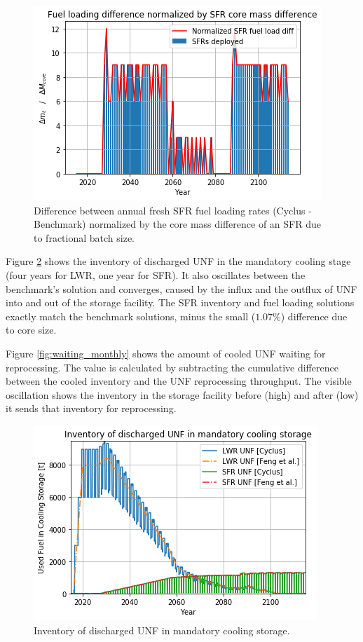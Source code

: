 \begin{figure}[htbp!]
    \begin{center}
        \includegraphics[scale=0.5]{./images/results_18/fuel_load_diff_norm.png}
    \end{center}
        \caption{Difference between annual fresh \gls{SFR} fuel loading rates (Cyclus - Benchmark) normalized by the core mass difference of an \gls{SFR} due to fractional batch size.}
    \label{fig:fuel_load_diff_norm}
\end{figure}


Figure \ref{fig:fuel_discharge_monthly} shows the inventory of discharged
\gls{UNF} in the mandatory cooling stage (four years for \gls{LWR}, one year for \gls{SFR}).
It also oscillates between the benchmark's
solution and converges, caused by the influx and the outflux of \gls{UNF}
into and out of the storage facility.
The \gls{SFR} inventory and fuel loading
solutions exactly match the benchmark solutions, minus the small ($1.07\%$) difference due to core
size.

Figure \ref{fig:waiting_monthly} shows the amount of cooled \gls{UNF} waiting for
reprocessing. The value is calculated by subtracting the cumulative difference between
the cooled inventory and the \gls{UNF} reprocessing throughput.
The visible oscillation shows the inventory in the storage facility 
before (high) and after (low) it sends that inventory for reprocessing.

\begin{figure}[htbp!]
    \begin{center}
        \includegraphics[scale=0.5]{./images/results_18/fuel_discharge_monthly.png}
    \end{center}
        \caption{Inventory of discharged \gls{UNF} in mandatory cooling storage.}
    \label{fig:fuel_discharge_monthly}
\end{figure}



